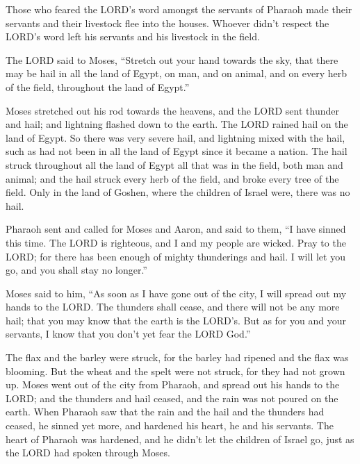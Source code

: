  Those who feared the LORD's word amongst the servants of
Pharaoh made their servants and their livestock flee into the houses.
 Whoever didn't respect the LORD's word left his servants
and his livestock in the field.

 The LORD said to Moses, ``Stretch out your hand towards
the sky, that there may be hail in all the land of Egypt, on man, and on
animal, and on every herb of the field, throughout the land of Egypt.''

 Moses stretched out his rod towards the heavens, and the
LORD sent thunder and hail; and lightning flashed down to the earth. The
LORD rained hail on the land of Egypt.  So there was very
severe hail, and lightning mixed with the hail, such as had not been in
all the land of Egypt since it became a nation.  The hail
struck throughout all the land of Egypt all that was in the field, both
man and animal; and the hail struck every herb of the field, and broke
every tree of the field.  Only in the land of Goshen,
where the children of Israel were, there was no hail.

 Pharaoh sent and called for Moses and Aaron, and said to
them, ``I have sinned this time. The LORD is righteous, and I and my
people are wicked.  Pray to the LORD; for there has been
enough of mighty thunderings and hail. I will let you go, and you shall
stay no longer.''

 Moses said to him, ``As soon as I have gone out of the
city, I will spread out my hands to the LORD. The thunders shall cease,
and there will not be any more hail; that you may know that the earth is
the LORD's.  But as for you and your servants, I know
that you don't yet fear the LORD God.''

 The flax and the barley were struck, for the barley had
ripened and the flax was blooming.  But the wheat and the
spelt were not struck, for they had not grown up.  Moses
went out of the city from Pharaoh, and spread out his hands to the LORD;
and the thunders and hail ceased, and the rain was not poured on the
earth.  When Pharaoh saw that the rain and the hail and
the thunders had ceased, he sinned yet more, and hardened his heart, he
and his servants.  The heart of Pharaoh was hardened, and
he didn't let the children of Israel go, just as the LORD had spoken
through Moses.

